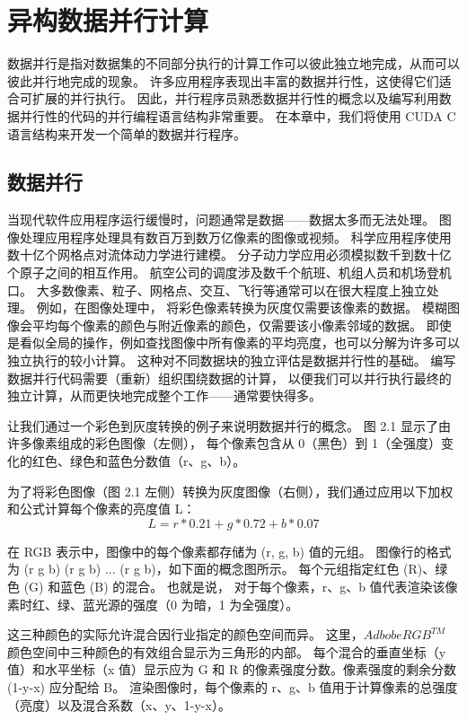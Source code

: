 \section{异构数据并行计算}

数据并行是指对数据集的不同部分执行的计算工作可以彼此独立地完成，从而可以彼此并行地完成的现象。 
许多应用程序表现出丰富的数据并行性，这使得它们适合可扩展的并行执行。 
因此，并行程序员熟悉数据并行性的概念以及编写利用数据并行性的代码的并行编程语言结构非常重要。 
在本章中，我们将使用 CUDA C 语言结构来开发一个简单的数据并行程序。

\subsection{数据并行}
当现代软件应用程序运行缓慢时，问题通常是数据——数据太多而无法处理。 
图像处理应用程序处理具有数百万到数万亿像素的图像或视频。 科学应用程序使用数十亿个网格点对流体动力学进行建模。 
分子动力学应用必须模拟数千到数十亿个原子之间的相互作用。 航空公司的调度涉及数千个航班、机组人员和机场登机口。 
大多数像素、粒子、网格点、交互、飞行等通常可以在很大程度上独立处理。 例如，在图像处理中，
将彩色像素转换为灰度仅需要该像素的数据。 模糊图像会平均每个像素的颜色与附近像素的颜色，仅需要该小像素邻域的数据。 
即使是看似全局的操作，例如查找图像中所有像素的平均亮度，也可以分解为许多可以独立执行的较小计算。 
这种对不同数据块的独立评估是数据并行性的基础。 编写数据并行代码需要（重新）组织围绕数据的计算，
以便我们可以并行执行最终的独立计算，从而更快地完成整个工作——通常要快得多。

让我们通过一个彩色到灰度转换的例子来说明数据并行的概念。 图 2.1 显示了由许多像素组成的彩色图像（左侧），
每个像素包含从 0（黑色）到 1（全强度）变化的红色、绿色和蓝色分数值（r、g、b）。

为了将彩色图像（图 2.1 左侧）转换为灰度图像（右侧），我们通过应用以下加权和公式计算每个像素的亮度值 L：
\begin{equation*}
	L = r*0.21 + g*0.72 + b * 0.07
\end{equation*}

\begin{remark}
在 RGB 表示中，图像中的每个像素都存储为 (r, g, b) 值的元组。 
图像行的格式为 (r g b) (r g b) ... (r g b)，如下面的概念图所示。 
每个元组指定红色 (R)、绿色 (G) 和蓝色 (B) 的混合。 也就是说，
对于每个像素，r、g、b 值代表渲染该像素时红、绿、蓝光源的强度（0 为暗，1 为全强度）。

这三种颜色的实际允许混合因行业指定的颜色空间而异。 
这里，$AdbobeRGB^{TM}$ 颜色空间中三种颜色的有效组合显示为三角形的内部。 
每个混合的垂直坐标（y 值）和水平坐标（x 值）显示应为 G 和 R 的像素强度分数。像素强度的剩余分数 (1-y-x) 应分配给 B。 
渲染图像时，每个像素的 r、g、b 值用于计算像素的总强度（亮度）以及混合系数（x、y、1-y-x）。
\end{remark}

